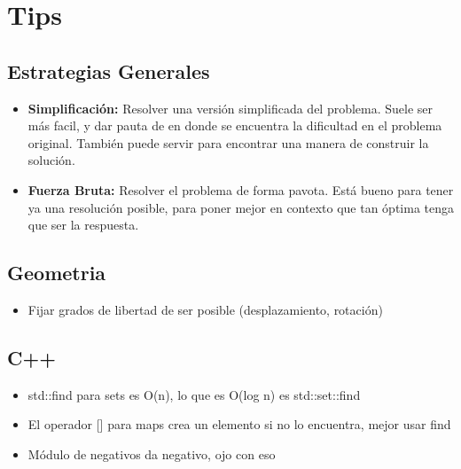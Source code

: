 \section{Tips}

\subsection*{Estrategias Generales}
\begin{itemize}
    \item \textbf{Simplificación:} Resolver una versión simplificada del problema. Suele ser más facil, y dar pauta de en donde se encuentra la dificultad en el problema original. También puede servir para encontrar una manera de construir la solución.
    \item \textbf{Fuerza Bruta:} Resolver el problema de forma pavota. Está bueno para tener ya una resolución posible, para poner mejor en contexto que tan óptima tenga que ser la respuesta.
\end{itemize}

\subsection*{Geometria}
\begin{itemize}
    \item Fijar grados de libertad de ser posible (desplazamiento, rotación)
\end{itemize}

\subsection*{C++}
\begin{itemize}
    \item std::find para sets es O(n), lo que es O(log n) es std::set::find
    \item El operador [] para maps crea un elemento si no lo encuentra, mejor usar find
    \item Módulo de negativos da negativo, ojo con eso
\end{itemize}
